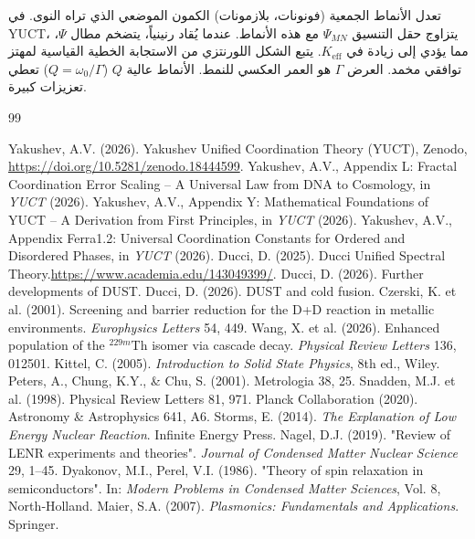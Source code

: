 \documentclass[11pt,a4paper]{article}
\newcommand{\Keff}{K_{\mathrm{eff}}}
\theoremstyle{remark}
\begin{document}
	تعدل الأنماط الجمعية (فونونات، بلازمونات) الكمون الموضعي الذي تراه النوى. في YUCT، يتزاوج حقل التنسيق \(\Psi_{MN}\) مع هذه الأنماط. عندما يُقاد رنينياً، يتضخم مطال \(\Psi\)، مما يؤدي إلى زيادة في \(\Keff\). يتبع الشكل اللورنتزي من الاستجابة الخطية القياسية لمهتز توافقي مخمد. العرض \(\Gamma\) هو العمر العكسي للنمط. الأنماط عالية \(Q\) (\(Q = \omega_0/\Gamma\)) تعطي تعزيزات كبيرة.
	
	\begin{thebibliography}{99}
		
		 Yakushev, A.V. (2026). Yakushev Unified Coordination Theory (YUCT), Zenodo, \url{https://doi.org/10.5281/zenodo.18444599}.
		 Yakushev, A.V., Appendix L: Fractal Coordination Error Scaling – A Universal Law from DNA to Cosmology, in \emph{YUCT} (2026).
		 Yakushev, A.V., Appendix Y: Mathematical Foundations of YUCT – A Derivation from First Principles, in \emph{YUCT} (2026).
		 Yakushev, A.V., Appendix Ferra1.2: Universal Coordination Constants for Ordered and Disordered Phases, in \emph{YUCT} (2026).
		 Ducci, D. (2025). Ducci Unified Spectral Theory.\url{https://www.academia.edu/143049399/}.
		 Ducci, D. (2026). Further developments of DUST.
		 Ducci, D. (2026). DUST and cold fusion.
		 Czerski, K. et al. (2001). Screening and barrier reduction for the D+D reaction in metallic environments. \textit{Europhysics Letters} 54, 449.
		 Wang, X. et al. (2026). Enhanced population of the \(^{229m}\)Th isomer via cascade decay. \textit{Physical Review Letters} 136, 012501.
		 Kittel, C. (2005). \textit{Introduction to Solid State Physics}, 8th ed., Wiley.
		 Peters, A., Chung, K.Y., \& Chu, S. (2001). Metrologia 38, 25.
		 Snadden, M.J. et al. (1998). Physical Review Letters 81, 971.
		 Planck Collaboration (2020). Astronomy \& Astrophysics 641, A6.
		 Storms, E. (2014). \textit{The Explanation of Low Energy Nuclear Reaction}. Infinite Energy Press.
		 Nagel, D.J. (2019). "Review of LENR experiments and theories". \textit{Journal of Condensed Matter Nuclear Science} 29, 1–45.
		 Dyakonov, M.I., Perel, V.I. (1986). "Theory of spin relaxation in semiconductors". In: \textit{Modern Problems in Condensed Matter Sciences}, Vol. 8, North‑Holland.
		 Maier, S.A. (2007). \textit{Plasmonics: Fundamentals and Applications}. Springer.

\end{thebibliography}
\end{document}
